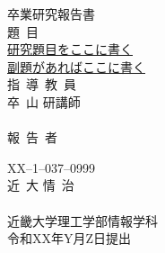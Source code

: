 

% 
\pagestyle{empty}

\begin{center}
\vspace*{1cm}
\large
{\LARGE 卒業研究報告書}\\
\vspace*{0.8cm}
題\ 目\\
\vspace*{1cm}
{\Huge \underline{研究題目をここに書く}}\\
\vspace{3mm}
{\LARGE \underline{副題があればここに書く}}\\

\vspace*{3cm}
指\ 導\ 教\ 員\\
\vspace*{0.3cm}
{\LARGE 卒\ 山\hspace{0.3cm} 研\hspace{0.3cm}講師}\\
\vspace*{-0.3cm}
\underline{\hspace*{5cm}}\\
\vspace*{3cm}
報\ 告\ 者\\
\vspace*{0.3cm}

{XX--1--037--0999}\\
\vspace*{0.3cm}
{\Huge 近\ 大\hspace{0.3em} 情\ 治\ }\\
\vspace*{-0.3cm}
\underline{\hspace*{5cm}}\\
\vspace*{0.5cm}
近畿大学理工学部情報学科\\
\vspace*{2cm}
令和XX年Y月Z日提出\\
\end{center}


 

